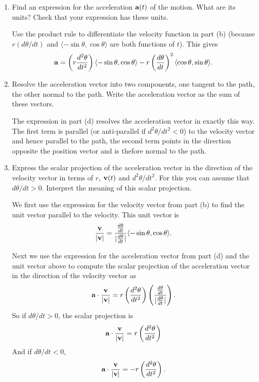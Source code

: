 \documentclass{ximera}
\begin{document}
\begin{question}
\begin{enumerate}
\item Find an expression for the acceleration ${\bf a}(t)$ of the motion. What are its units? Check that your expression has these units.

\begin{expandable}
Use the product rule to differentiate the velocity function in part (b) (because $r (d\theta/dt)$ and $\langle -\sin\theta, \cos\theta\rangle$ are both functions of $t$). This gives
\[
  {\bf a} =  \left( r \frac{d^2\theta}{dt^2} \right) \langle -\sin \theta , \cos\theta \rangle - r \left( \frac{d\theta}{dt} \right)^2 \langle \cos\theta , \sin\theta \rangle .
\]
\end{expandable}


\item Resolve the acceleration vector into two components, one tangent to the path, the other normal to the path. Write the acceleration vector as the sum of these vectors.

\begin{expandable}
The expression in part (d) resolves the acceleration vector in exactly this way. The first term is parallel (or anti-parallel if $d^2\theta/dt^2<0$) to the velocity vector and hence parallel to the path, the second term points in the direction opposite the position vector and is thefore normal to the path.
\end{expandable}

\item Express the scalar projection of the acceleration vector in the direction of the velocity vector in terms of $r$, ${\bf v}(t)$ and $d^2\theta/dt^2$. For this you can assume that $d\theta / dt>0$. Interpret the meaning of this scalar projection.

\begin{expandable}
We first use the expression for the velocity vector from part (b) to find the unit vector parallel to the velocity. This unit vector is
\[
   \frac{{\bf v}}{|{\bf v|}} = \frac{\frac{d\theta}{dt}}{|\frac{d\theta}{dt}|} \langle -\sin\theta, \cos\theta \rangle.
\]

Next we use the expression for the acceleration vector from part (d) and the unit vector above to compute the scalar projection of the acceleration vector in the direction of the velocity vector as
\[
    {\bf a}\cdot \frac{{\bf v}}{|{\bf v|}} = r \left( \frac{d^2\theta}{dt^2} \right)\left(\frac{\frac{d\theta}{dt}}{|\frac{d\theta}{dt}|}\right).
\]
So if $d\theta/dt >0$, the scalar projection is
\[
   {\bf a}\cdot \frac{{\bf v}}{|{\bf v|}} =  r \left( \frac{d^2\theta}{dt^2} \right)
\]
And if $d\theta/dt <0$, 
\[
   {\bf a}\cdot \frac{{\bf v}}{|{\bf v|}} =  - r \left( \frac{d^2\theta}{dt^2} \right) .
\]


\end{expandable}
\end{enumerate}
\end{question}
\end{document}
